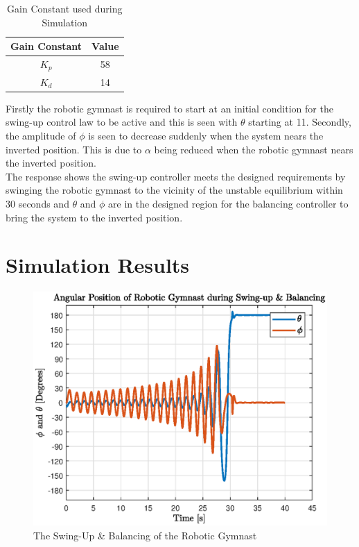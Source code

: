\begin{table}[]
	\centering
	\begin{tabular}{|c|c|}
		\hline
		Gain Constant & Value \\
		\hline
		\hline
		$K_{p}$  & 58 \\
		\hline
		$K_{d}$  & 14 \\
		\hline
	\end{tabular}
	\caption{Gain Constant used during Simulation}
	\label{table:gain_constants}
	\end{table}

Firstly the robotic gymnast is required to start at an initial condition for the swing-up control law to be active and this is seen with $\theta$ starting at 11\textdegree. Secondly, the amplitude of $\phi$ is seen to decrease suddenly when the system nears the inverted position. This is due to $\alpha$ being reduced when the robotic gymnast nears the inverted position.\\

The response shows the swing-up controller meets the designed requirements by swinging the robotic gymnast to the vicinity of the unstable equilibrium within 30 seconds and $\theta$ and $\phi$ are in the designed region for the balancing controller to bring the system to the inverted position.



\section{Simulation Results}
\begin{figure}[h]
	\centering
	\includegraphics[scale=0.9]{./figs/swingup_balance}
	\caption{The Swing-Up \& Balancing of the Robotic Gymnast}
	\label{fig:swingup_balance}
\end{figure}

